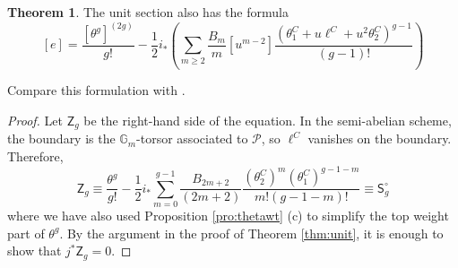 \documentclass[11pt]{article}
\theoremstyle{definition}
\newtheorem{theorem}[definition]{Theorem}
\begin{document}
\begin{theorem}\label{thm:altzero}
	The unit section also has the formula
    $$
    [e] = \frac{[\theta^g]^{(2g)}}{g!} - \frac12 i_*\left(\sum_{m \geq 2}\frac{B_m}{m}[u^{m-2}]\frac{(\theta_1^C + u\ell^C + u^2\theta_2^C)^{g-1}}{(g-1)!}\right)
    $$
\end{theorem}
Compare this formulation with \cite[Theorem 1.3]{BMP}.
\begin{proof}
    Let $\mathsf{Z}_g$ be the right-hand side of the equation. In the semi-abelian scheme, the boundary is the $\mathbb G_m$-torsor associated to $\mathcal P$, so $\ell^C$ vanishes on the boundary. Therefore,
    $$
    \mathsf{Z}_g \equiv \frac{\theta^g}{g!} - \frac{1}{2}i_*\sum_{m=0}^{g-1}\frac{B_{2m+2}}{(2m+2)}\frac{(\theta_2^C)^m(\theta_1^C)^{g-1-m}}{m!(g-1-m)!} \equiv \mathsf{S}_g^\circ
    $$
    where we have also used Proposition \ref{pro:thetawt} (c) to simplify the top weight part of $\theta^g$. By the argument in the proof of Theorem \ref{thm:unit}, it is enough to show that $j^* \mathsf{Z}_g=0$.


\end{proof}
\end{document}
